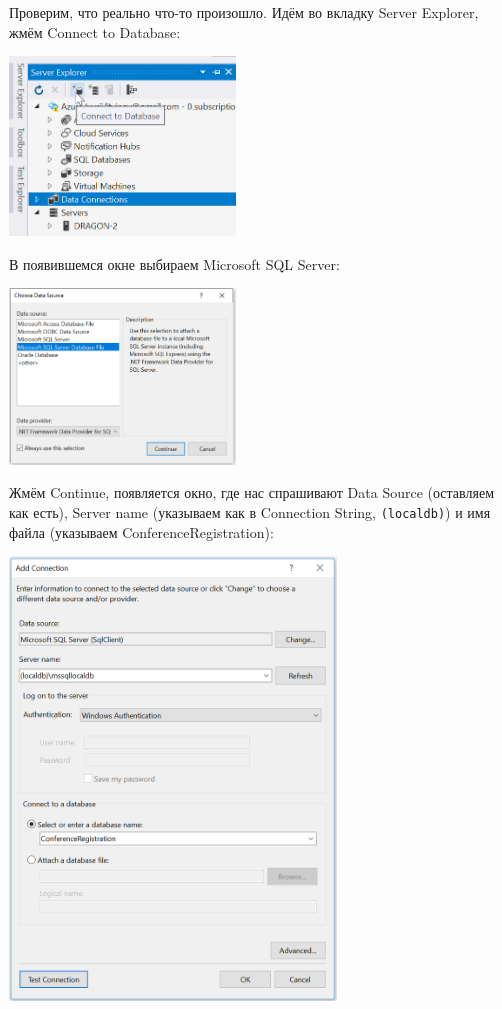 \documentclass[a5paper]{article}
\begin{document}
Проверим, что реально что-то произошло. Идём во вкладку Server Explorer, жмём Connect to Database:

\begin{center}
    \includegraphics[width=0.45\textwidth]{serverExplorer.png}
\end{center}

В появившемся окне выбираем Microsoft SQL Server:

\begin{center}
    \includegraphics[width=0.45\textwidth]{chooseDataSource.png}
\end{center}

Жмём Continue, появляется окно, где нас спрашивают Data Source (оставляем как есть), Server name (указываем как в Connection String, \texttt{(localdb)\mssqllocaldb}) и имя файла (указываем ConferenceRegistration):

\begin{center}
    \includegraphics[width=0.65\textwidth]{addConnection.png}
\end{center}
\end{document}
